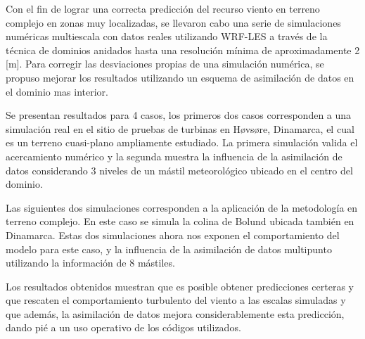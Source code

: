 Con el fin de lograr una correcta predicción del recurso viento en terreno complejo en zonas muy localizadas, se llevaron cabo una serie de simulaciones numéricas multiescala con datos reales utilizando WRF-LES a través de la técnica de dominios anidados hasta una resolución mínima de aproximadamente 2 [m]. Para corregir las desviaciones propias de una simulación numérica, se propuso mejorar los resultados utilizando un esquema de asimilación de datos en el dominio mas interior.

Se presentan resultados para 4 casos, los primeros dos casos corresponden a una simulación real en el sitio de pruebas de turbinas en Høvsøre, Dinamarca, el cual es un terreno cuasi-plano ampliamente estudiado. La primera simulación valida el acercamiento numérico y la segunda muestra la influencia de la asimilación de datos considerando 3 niveles de un mástil meteorológico ubicado en el centro del dominio.

Las siguientes dos simulaciones corresponden a la aplicación de la metodología en terreno complejo. En este caso se simula la colina de Bolund ubicada también en Dinamarca. Estas dos simulaciones ahora nos exponen el comportamiento del modelo para este caso, y la influencia de la asimilación de datos multipunto utilizando la información de 8 mástiles.

Los resultados obtenidos muestran que es posible obtener predicciones certeras y que rescaten el comportamiento turbulento del viento a las escalas simuladas y que además, la asimilación de datos mejora considerablemente esta predicción, dando pié a un uso operativo de los códigos utilizados.

